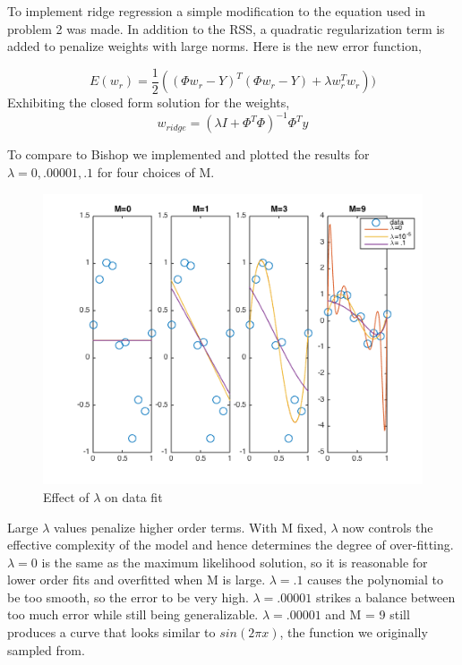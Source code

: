 \documentclass[10pt,twocolumn]{article}
\begin{document}
To implement ridge regression a simple modification to the equation used in problem 2 was made. In addition to the RSS, a quadratic regularization term is added to penalize weights with large norms. Here is the new error function,

\begin{equation}
E(w_{r}) = \frac{1}{2}((\Phi w_{r}  -Y)^T( \Phi w_{r}  -Y) + \lambda w_{r}^T w_{r}))
\end{equation}
Exhibiting the closed form solution for the weights,
\begin{equation}
w_{ridge} = (\lambda I + \Phi^T  \Phi)^{-1}  \Phi^T y
\end{equation}

To compare to Bishop we implemented and plotted the results for $\lambda = {0, .00001, .1} $ for four choices of M.

\begin{figure}[H]
\center
\includegraphics[scale =.45]{rr_lambdas.png}
\caption{Effect of $\lambda$ on data fit}
\end{figure}

Large $\lambda$ values penalize higher order terms. With M fixed, $\lambda$ now controls the effective complexity
of the model and hence determines the degree of over-fitting.  $\lambda = 0$ is the same as the maximum likelihood solution, so it is reasonable for lower order fits and overfitted when M is large. $\lambda = .1$ causes the polynomial to be too smooth, so the error to be very high. $\lambda = .00001$ strikes a balance between too much error while still being generalizable. $\lambda = .00001$ and M = 9 still produces a curve that looks similar to $sin(2\pi x)$, the function we originally sampled from.
\end{document}

